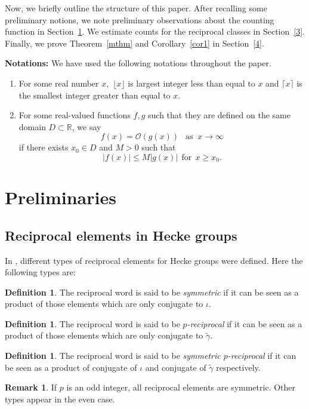 \documentclass[11pt]{amsart}
\numberwithin{equation}{section}
\theoremstyle{definition}
\newtheorem{defn}[theorem]{Definition}
\newtheorem{rk}[theorem]{Remark}
\newcommand{\gt}{\tilde{\gamma}}
\newcommand{\tb}{\textbf}
\newcommand{\io}{\iota }
\newcommand{\secref}[1]{Section~\ref{#1}}
\newcommand{\thmref}[1]{Theorem~\ref{#1}}
\newcommand{\corref}[1]{Corollary~\ref{#1}}
\numberwithin{equation}{section}
\begin{document}
 
	
	Now, we briefly outline the structure of this paper. After recalling some preliminary notions, we note preliminary observations about the counting function in \secref{prel}. We estimate counts for the reciprocal classes in \secref{3}. Finally, we prove \thmref{mthm} and \corref{cor1} in \secref{4}.  
	
	
	\medskip
	\tb{Notations:} We have used the following notations throughout the paper.
	\begin{enumerate}
		\item For some real number $x,$ $\lfloor x\rfloor$ is largest integer less than equal to $x$ and $\lceil x\rceil$ is the smallest integer greater than equal to $x$. 
		\item For some real-valued functions $f,g$ such that they are defined on the  same domain $D\subset \mathbb{R}$, we  say \[f(x)=\mathcal{O}(g(x))~~\text{ as }~x\rightarrow\infty \] if there exists $x_0\in D$ and $M>0$ such that \[|f(x)|\leq M|g(x)|~~\text{for}~~x\geq x_0.\] 
	\end{enumerate}
	
	\section{Preliminaries}\label{prel}
	
	\subsection{Reciprocal elements in Hecke groups}In \cite{DG}, different types of reciprocal elements for Hecke groups were defined. Here the following types are:
	\begin{defn}
		The reciprocal word is said to be \textit{symmetric} if it can be seen as a product of those elements which are only conjugate to $ \io $.
	\end{defn}
	\begin{defn}
		The reciprocal word is said to be \textit{$ p $-reciprocal} if it can be seen as a product of those elements which are only conjugate to $ \gt $.
	\end{defn}
	\begin{defn}
		The reciprocal word is said to be \textit{symmetric $ p $-reciprocal} if it can be seen as a product of conjugate of $\io$ and conjugate of $ \gt $ respectively.
	\end{defn}
	\begin{rk}
		If $p$ is an odd integer, all reciprocal elements are symmetric. Other types appear in the even case.
	\end{rk}
\end{document}
